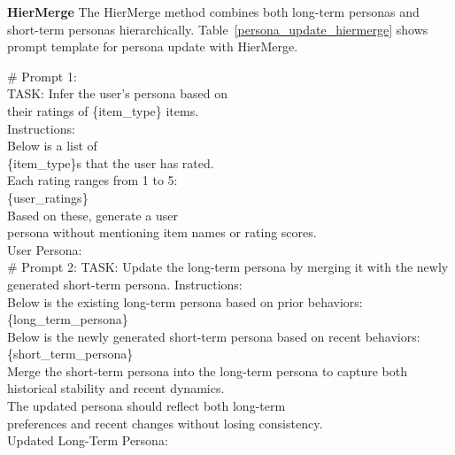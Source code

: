\textbf{HierMerge}  
    The HierMerge method combines both long-term personas and short-term personas hierarchically. 
    Table~\ref{persona_update_hiermerge} shows prompt template for persona update with HierMerge.
    \begin{tcolorbox}
    {\selectfont\small
    \# Prompt 1:\\
    TASK: Infer the user's persona based on \\
    their ratings of \{item\_type\} items.\\
    Instructions: \\
    Below is a list of \\
    \{item\_type\}s that the user has rated.\\
    Each rating ranges from 1 to 5:\\
    \{user\_ratings\}\\
    Based on these, generate a user\\
     persona without mentioning item names or rating scores.\\
    User Persona:\\

    


    \# Prompt 2:
    TASK: 
    Update the long-term persona by merging 
    it with the newly generated short-term 
    persona.
    Instructions: \\
    Below is 
    the existing long-term persona based 
    on prior behaviors:\{long\_term\_persona\} \\
    Below is the newly generated short-term persona 
    based on recent behaviors:\{short\_term\_persona\} \\ 
    Merge the short-term persona into the long-term persona 
    to capture both historical stability and recent dynamics.\\ 
    The updated persona should reflect both long-term \\
    preferences and recent changes without losing consistency.\\ 
    Updated Long-Term Persona: \\
   
    }
    \end{tcolorbox}
    \noindent\begin{minipage}{0.48\textwidth}
    \label{persona_update_hiermerge}
    \end{minipage}
    




